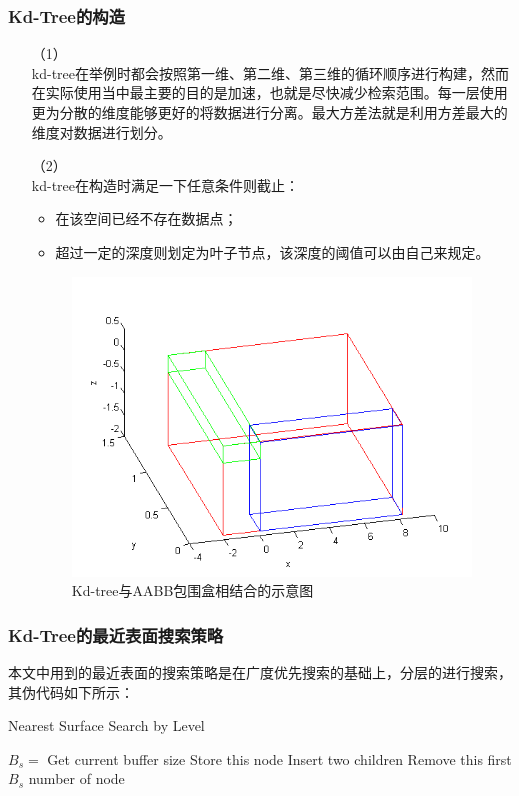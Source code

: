 \documentclass[10pt]{article}
\begin{document}
\subsubsection{Kd-Tree的构造}
\begin{itemize}
\item[（1）]{} \mbox{} \\
kd-tree在举例时都会按照第一维、第二维、第三维的循环顺序进行构建，然而在实际使用当中最主要的目的是加速，也就是尽快减少检索范围。每一层使用更为分散的维度能够更好的将数据进行分离。最大方差法就是利用方差最大的维度对数据进行划分。
\item[（2）]{} \mbox{} \\
kd-tree在构造时满足一下任意条件则截止：
\begin{itemize}
\item{在该空间已经不存在数据点；}
\item{超过一定的深度则划定为叶子节点，该深度的阈值可以由自己来规定。}
\end{itemize}

\begin{figure}[H]
\begin{center}
\includegraphics[scale=0.5]{kd-tree-structure.png}
\caption{Kd-tree与AABB包围盒相结合的示意图}
\end{center}
\end{figure}
\end{itemize}
\subsubsection{Kd-Tree的最近表面搜索策略}
本文中用到的最近表面的搜索策略是在广度优先搜索的基础上，分层的进行搜索，其伪代码如下所示：
\begin{algorithm}[H]
	\caption{Nearest Surface Search by Level}%
	\begin{algorithmic}[1]%
		\STATE $B_s =$ Get current buffer size
		\STATE Store this node
		\ENDIF		
		\ELSE
		\STATE Insert two children
		\ENDIF
		\STATE Remove this first $B_s$ number of node
		\ENDFOR
	\end{algorithmic}
\end{algorithm}
\end{document}
